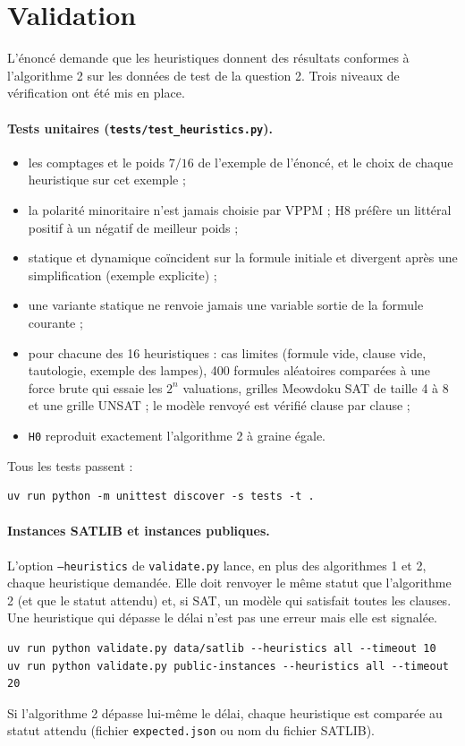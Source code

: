 \documentclass[11pt,a4paper]{article}
\begin{document}
\section{Validation}
\label{sec:validation}

L'énoncé demande que les heuristiques donnent des résultats conformes à
l'algorithme 2 sur les données de test de la question 2. Trois niveaux de
vérification ont été mis en place.

\paragraph{Tests unitaires (\texttt{tests/test\_heuristics.py}).}
\begin{itemize}
  \item les comptages et le poids $7/16$ de l'exemple de l'énoncé, et le
    choix de chaque heuristique sur cet exemple ;
  \item la polarité minoritaire n'est jamais choisie par VPPM ; H8 préfère
    un littéral positif à un négatif de meilleur poids ;
  \item statique et dynamique coïncident sur la formule initiale et
    divergent après une simplification (exemple explicite) ;
  \item une variante statique ne renvoie jamais une variable sortie de la
    formule courante ;
  \item pour chacune des 16 heuristiques : cas limites (formule vide,
    clause vide, tautologie, exemple des lampes), 400 formules aléatoires
    comparées à une force brute qui essaie les $2^n$ valuations, grilles
    Meowdoku SAT de taille 4 à 8 et une grille UNSAT ; le modèle renvoyé
    est vérifié clause par clause ;
  \item \texttt{H0} reproduit exactement l'algorithme 2 à graine égale.
\end{itemize}
Tous les tests passent :
\begin{lstlisting}
uv run python -m unittest discover -s tests -t .
\end{lstlisting}

\paragraph{Instances SATLIB et instances publiques.} L'option
\texttt{--heuristics} de \texttt{validate.py} lance, en plus des
algorithmes 1 et 2, chaque heuristique demandée. Elle doit renvoyer le même
statut que l'algorithme 2 (et que le statut attendu) et, si SAT, un modèle
qui satisfait toutes les clauses. Une heuristique qui dépasse le délai n'est
pas une erreur mais elle est signalée.
\begin{lstlisting}
uv run python validate.py data/satlib --heuristics all --timeout 10
uv run python validate.py public-instances --heuristics all --timeout 20
\end{lstlisting}
Si l'algorithme 2 dépasse lui-même le délai, chaque heuristique est comparée
au statut attendu (fichier \texttt{expected.json} ou nom du fichier SATLIB).
\end{document}
